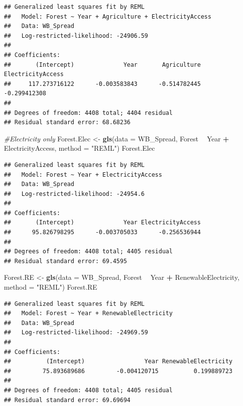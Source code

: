\documentclass[12pt,]{article}
\newenvironment{Shaded}{\begin{snugshade}}{\end{snugshade}}
\newcommand{\KeywordTok}[1]{\textcolor[rgb]{0.13,0.29,0.53}{\textbf{#1}}}
\newcommand{\DataTypeTok}[1]{\textcolor[rgb]{0.13,0.29,0.53}{#1}}
\newcommand{\StringTok}[1]{\textcolor[rgb]{0.31,0.60,0.02}{#1}}
\newcommand{\CommentTok}[1]{\textcolor[rgb]{0.56,0.35,0.01}{\textit{#1}}}
\newcommand{\OperatorTok}[1]{\textcolor[rgb]{0.81,0.36,0.00}{\textbf{#1}}}
\newcommand{\NormalTok}[1]{#1}
\begin{document}
\begin{verbatim}
## Generalized least squares fit by REML
##   Model: Forest ~ Year + Agriculture + ElectricityAccess 
##   Data: WB_Spread 
##   Log-restricted-likelihood: -24906.59
## 
## Coefficients:
##       (Intercept)              Year       Agriculture ElectricityAccess 
##     117.273716122      -0.003583843      -0.514782445      -0.299412308 
## 
## Degrees of freedom: 4408 total; 4404 residual
## Residual standard error: 68.68236
\end{verbatim}

\begin{Shaded}
\begin{Highlighting}[]
\CommentTok{#Electricity only }
\NormalTok{Forest.Elec <-}\StringTok{ }\KeywordTok{gls}\NormalTok{(}\DataTypeTok{data =}\NormalTok{ WB_Spread, }
\NormalTok{                    Forest }\OperatorTok{~}\StringTok{ }\NormalTok{Year }\OperatorTok{+}\StringTok{ }\NormalTok{ElectricityAccess,}
                    \DataTypeTok{method =} \StringTok{"REML"}\NormalTok{)}
\NormalTok{Forest.Elec}
\end{Highlighting}
\end{Shaded}

\begin{verbatim}
## Generalized least squares fit by REML
##   Model: Forest ~ Year + ElectricityAccess 
##   Data: WB_Spread 
##   Log-restricted-likelihood: -24954.6
## 
## Coefficients:
##       (Intercept)              Year ElectricityAccess 
##      95.826798295      -0.003705033      -0.256536944 
## 
## Degrees of freedom: 4408 total; 4405 residual
## Residual standard error: 69.4595
\end{verbatim}

\begin{Shaded}
\begin{Highlighting}[]
\NormalTok{Forest.RE <-}\StringTok{ }\KeywordTok{gls}\NormalTok{(}\DataTypeTok{data =}\NormalTok{ WB_Spread, }
\NormalTok{                    Forest }\OperatorTok{~}\StringTok{ }\NormalTok{Year }\OperatorTok{+}\StringTok{ }\NormalTok{RenewableElectricity,}
                    \DataTypeTok{method =} \StringTok{"REML"}\NormalTok{)}
\NormalTok{Forest.RE}
\end{Highlighting}
\end{Shaded}

\begin{verbatim}
## Generalized least squares fit by REML
##   Model: Forest ~ Year + RenewableElectricity 
##   Data: WB_Spread 
##   Log-restricted-likelihood: -24969.59
## 
## Coefficients:
##          (Intercept)                 Year RenewableElectricity 
##         75.893689686         -0.004120715          0.199889723 
## 
## Degrees of freedom: 4408 total; 4405 residual
## Residual standard error: 69.69694
\end{verbatim}
\end{document}
